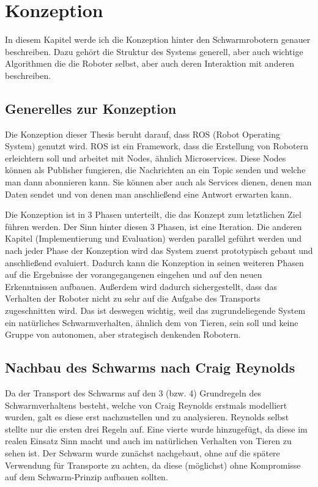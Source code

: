 \chapter{Konzeption}\label{ch:Konzeption}

In diesem Kapitel werde ich die Konzeption hinter den Schwarmrobotern genauer beschreiben. Dazu gehört die Struktur des Systems generell, aber auch wichtige Algorithmen die die Roboter selbst, aber auch deren Interaktion mit anderen beschreiben.

\section{Generelles zur Konzeption}

Die Konzeption dieser Thesis beruht darauf, dass ROS (Robot Operating System) genutzt wird. ROS ist ein Framework, dass die Erstellung von Robotern erleichtern soll und arbeitet mit Nodes, ähnlich Microservices. Diese Nodes können als Publisher fungieren, die Nachrichten an ein Topic senden und welche man dann abonnieren kann. Sie können aber auch als Services dienen, denen man Daten sendet und von denen man anschließend eine Antwort erwarten kann.

Die Konzeption ist in 3 Phasen unterteilt, die das Konzept zum letztlichen Ziel führen werden. Der Sinn hinter diesen 3 Phasen, ist eine Iteration. Die anderen Kapitel (Implementierung und Evaluation) werden parallel geführt werden und nach jeder Phase der Konzeption wird das System zuerst prototypisch gebaut und anschließend evaluiert. Dadurch kann die Konzeption in seinen weiteren Phasen auf die Ergebnisse der vorangegangenen eingehen und auf den neuen Erkenntnissen aufbauen. Außerdem wird dadurch sichergestellt, dass das Verhalten der Roboter nicht zu sehr auf die Aufgabe des Transports zugeschnitten wird. Das ist deswegen wichtig, weil das zugrundeliegende System ein natürliches Schwarmverhalten, ähnlich dem von Tieren, sein soll und keine Gruppe von autonomen, aber strategisch denkenden Robotern.

\section{Nachbau des Schwarms nach Craig Reynolds}
Da der Transport des Schwarms auf den 3 (bzw. 4) Grundregeln des Schwarmverhaltens besteht, welche von Craig Reynolds erstmals modelliert wurden\cite{CraigReynolds_Boids}, galt es diese erst nachzustellen und zu analysieren. Reynolds selbst stellte nur die ersten drei Regeln auf. Eine vierte wurde hinzugefügt, da diese im realen Einsatz Sinn macht und auch im natürlichen Verhalten von Tieren zu sehen ist. Der Schwarm wurde zunächst nachgebaut, ohne auf die spätere Verwendung für Transporte zu achten, da diese (möglichst) ohne Kompromisse auf dem Schwarm-Prinzip aufbauen sollten. 

